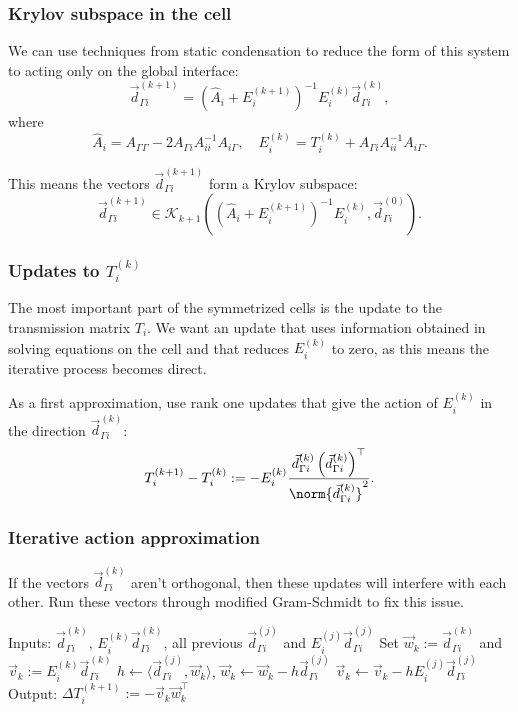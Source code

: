 \documentclass{beamer}
\begin{document}
\begin{frame}
\frametitle{Krylov subspace in the cell}

We can use techniques from static condensation to reduce the form of this system to acting only on the global interface:
\begin{equation}
	\vec{d}_{\Gamma i}^{(k+1)} = \left ( \hat{A}_i + E_i^{(k+1)} \right )^{-1} E_i^{(k)} \vec{d}_{\Gamma i}^{(k)},
\end{equation}
where
\begin{equation*}
	\hat{A}_i = A_{\Gamma \Gamma} - 2 A_{\Gamma i} A_{ii}^{-1} A_{i \Gamma}, \quad E_i^{(k)} = T_i^{(k)} + A_{\Gamma i} A_{ii}^{-1} A_{i \Gamma}.
\end{equation*}

This means the vectors $\vec{d}_{\Gamma i}^{(k+1)}$ form a Krylov subspace:
\begin{equation} \label{eq: Krylov subspace}
	\vec{d}_{\Gamma i}^{(k+1)} \in \mathcal{K}_{k+1} \left ( \left ( \hat{A}_i + E_i^{(k+1)} \right )^{-1} E_i^{(k)}, \vec{d}_{\Gamma i}^{(0)} \right ).
\end{equation}
\end{frame}

\begin{frame}
\frametitle{Updates to $T_i^{(k)}$}

The most important part of the symmetrized cells is the update to the transmission matrix $T_i$.
We want an update that uses information obtained in solving equations on the cell and that reduces $E_i^{(k)}$ to zero, as this means the iterative process becomes direct.

As a first approximation, use rank one updates that give the action of $E_i^{(k)}$ in the direction $\vec{d}_{\Gamma i}^{(k)}$:
\begin{equation*}
	T_i^{(k+1)} - T_i^{(k)} := - E_i^{(k)} \frac{\vec{d}_{\Gamma i}^{(k)} \left ( \vec{d}_{\Gamma i}^{(k)} \right )^\top}{\norm{\vec{d}_{\Gamma i}^{(k)}}^2}.
\end{equation*}
\end{frame}

\begin{frame}
\frametitle{Iterative action approximation}

If the vectors $\vec{d}_{\Gamma i}^{(k)}$ aren't orthogonal, then these updates will interfere with each other.
Run these vectors through modified Gram-Schmidt to fix this issue.
	\begin{algorithmic}[1]
		\State Inputs: $\vec{d}_{\Gamma i}^{(k)}$, $E_i^{(k)} \vec{d}_{\Gamma i}^{(k)}$, all previous $\vec{d}_{\Gamma i}^{(j)}$ and $E_i^{(j)} \vec{d}_{\Gamma i}^{(j)}$
		\State Set $\vec{w}_k := \vec{d}_{\Gamma i}^{(k)}$ and $\vec{v}_k := E_i^{(k)} \vec{d}_{\Gamma i}^{(k)}$
			\State $h \gets \langle \vec{d}_{\Gamma i}^{(j)}, \vec{w}_k \rangle$, $\vec{w}_k \gets \vec{w}_k - h \vec{d}_{\Gamma i}^{(j)}$
			\State $\vec{v}_k \gets \vec{v}_k - h E_i^{(j)} \vec{d}_{\Gamma i}^{(j)}$
		\EndFor
		\State Output: $\Delta T_i^{(k+1)} := -\vec{v}_k \vec{w}_k^\top$
	\end{algorithmic}
\end{frame}
\end{document}
